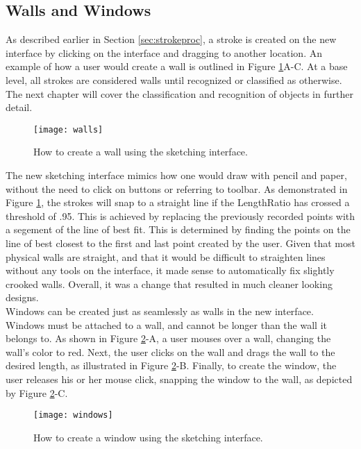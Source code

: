 \subsection{Walls and Windows}

As described earlier in Section \ref{sec:strokeproc}, a stroke is created on the new interface by clicking on the interface and dragging to another location. An example of how a user would create a wall is outlined in Figure \ref{fig:walls}A-C. At a base level, all strokes are considered walls until recognized or classified as otherwise. The next chapter will cover the classification and recognition of objects in further detail.

\begin{figure}[ht]
\centering
\texttt{[image: walls]}
\caption[How to create a wall using the sketching interface]{How to create a wall using the sketching interface.}
\label{fig:walls}
\end{figure}

The new sketching interface mimics how one would draw with pencil and paper, without the need to click on buttons or referring to toolbar. As demonstrated in Figure \ref{fig:walls}, the strokes will snap to a straight line if the LengthRatio has crossed a threshold of .95. This is achieved by replacing the previously recorded points with a segement of the line of best fit. This is determined by finding the points on the line of best closest to the first and last point created by the user. Given that most physical walls are straight, and that it would be difficult to straighten lines without any tools on the interface, it made sense to automatically fix slightly crooked walls. Overall, it was a change that resulted in much cleaner looking designs. \\

Windows can be created just as seamlessly as walls in the new interface. Windows must be attached to a wall, and cannot be longer than the wall it belongs to. As shown in Figure \ref{fig:windows}-A, a user mouses over a wall, changing the wall's color to red. Next, the user clicks on the wall and drags the wall to the desired length, as illustrated in Figure \ref{fig:windows}-B. Finally, to create the window, the user releases his or her mouse click, snapping the window to the wall, as depicted by Figure \ref{fig:windows}-C.

\begin{figure}[ht]
\centering
\texttt{[image: windows]}
\caption[How to create a window using the sketching interface]{How to create a window using the sketching interface.}
\label{fig:windows}
\end{figure}


